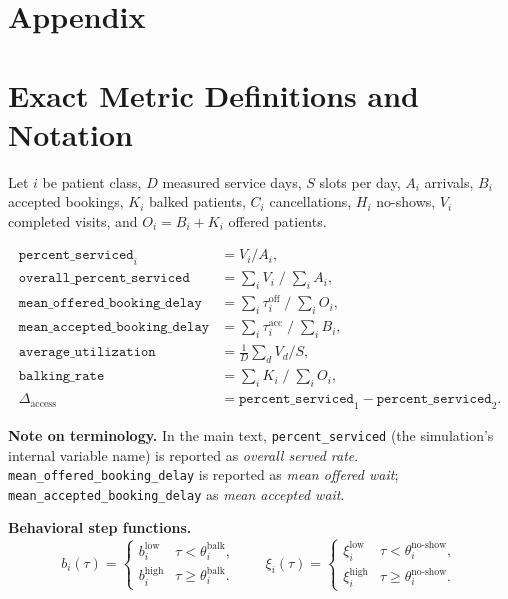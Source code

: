 \documentclass[11pt]{article}
\begin{document}
\newpage
\section*{Appendix}
\appendix

\section{Exact Metric Definitions and Notation}
\label{app:defs}

Let $i$ be patient class, $D$ measured service days, $S$ slots per day,
$A_i$ arrivals, $B_i$ accepted bookings, $K_i$ balked patients, $C_i$
cancellations, $H_i$ no-shows, $V_i$ completed visits, and
$O_i = B_i + K_i$ offered patients.

\begin{align*}
\texttt{percent\_serviced}_i &= V_i / A_i, \\
\texttt{overall\_percent\_serviced} &= \textstyle\sum_i V_i \;/\; \textstyle\sum_i A_i, \\
\texttt{mean\_offered\_booking\_delay} &= \textstyle\sum_i \tau^{\text{off}}_i \;/\; \textstyle\sum_i O_i, \\
\texttt{mean\_accepted\_booking\_delay} &= \textstyle\sum_i \tau^{\text{acc}}_i \;/\; \textstyle\sum_i B_i, \\
\texttt{average\_utilization} &= \tfrac{1}{D}\textstyle\sum_d V_d / S, \\
\texttt{balking\_rate} &= \textstyle\sum_i K_i \;/\; \textstyle\sum_i O_i, \\
\Delta_{\text{access}} &= \texttt{percent\_serviced}_1 - \texttt{percent\_serviced}_2.
\end{align*}

\noindent\textbf{Note on terminology.} In the main text,
\texttt{percent\_serviced} (the simulation's internal variable name) is
reported as \emph{overall served rate}. \texttt{mean\_offered\_booking\_delay}
is reported as \emph{mean offered wait}; \texttt{mean\_accepted\_booking\_delay}
as \emph{mean accepted wait}.

\medskip
\noindent\textbf{Behavioral step functions.}
\[
  b_i(\tau) = \begin{cases}
    b_i^{\text{low}} & \tau < \theta_i^{\text{balk}}, \\
    b_i^{\text{high}} & \tau \geq \theta_i^{\text{balk}}.
  \end{cases}
  \qquad
  \xi_i(\tau) = \begin{cases}
    \xi_i^{\text{low}} & \tau < \theta_i^{\text{no-show}}, \\
    \xi_i^{\text{high}} & \tau \geq \theta_i^{\text{no-show}}.
  \end{cases}
\]
\end{document}
